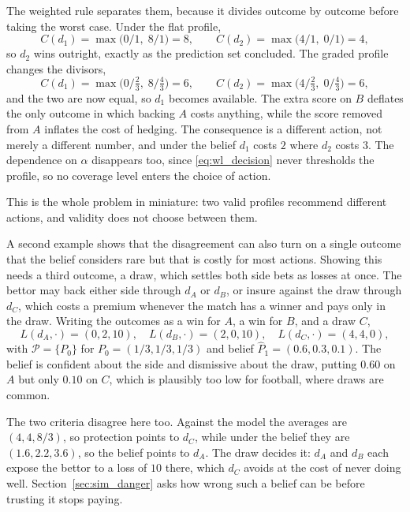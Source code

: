 The weighted rule separates them, because it divides outcome by outcome before
taking the worst case. Under the flat profile,
\[
  C(d_1)=\max\bigl(0/1,\; 8/1\bigr)=8,
  \qquad
  C(d_2)=\max\bigl(4/1,\; 0/1\bigr)=4,
\]
so $d_2$ wins outright, exactly as the prediction set concluded. The graded
profile changes the divisors,
\[
  C(d_1)=\max\bigl(0\big/\tfrac23,\; 8\big/\tfrac43\bigr)=6,
  \qquad
  C(d_2)=\max\bigl(4\big/\tfrac23,\; 0\big/\tfrac43\bigr)=6,
\]
and the two are now equal, so $d_1$ becomes available. The extra score on $B$
deflates the only outcome in which backing $A$ costs anything, while the score
removed from $A$ inflates the cost of hedging. The consequence is a different
action, not merely a different number, and under the belief $d_1$ costs $2$
where $d_2$ costs $3$. The dependence on $\alpha$ disappears too, since
\eqref{eq:wl_decision} never thresholds the profile, so no coverage level
enters the choice of action.

This is the whole problem in miniature: two valid profiles recommend
different actions, and validity does not choose between them.

A second example shows that the disagreement can also turn on a single
outcome that the belief considers rare but that is costly for most actions.
Showing this needs a third outcome, a draw, which settles both side bets as
losses at once. The bettor may back either side through $d_A$ or $d_B$, or
insure against the draw through $d_C$, which costs a premium whenever the
match has a winner and pays only in the draw. Writing the outcomes as a win
for $A$, a win for $B$, and a draw $C$,
\begin{equation}
  L(d_A,\cdot)=(0,2,10),\quad
  L(d_B,\cdot)=(2,0,10),\quad
  L(d_C,\cdot)=(4,4,0),
  \label{eq:three_loss}
\end{equation}
with $\mathcal P=\{P_0\}$ for $P_0=(1/3,1/3,1/3)$ and belief
$\widehat P_1=(0.6,0.3,0.1)$. The belief is confident about the side and
dismissive about the draw, putting $0.60$ on $A$ but only $0.10$ on $C$, which is
plausibly too low for football, where draws are common.

The two criteria disagree here too. Against the model the averages are
$(4,4,8/3)$, so protection points to $d_C$, while under the belief they are
$(1.6,2.2,3.6)$, so the belief points to $d_A$. The draw decides it: $d_A$ and $d_B$ each
expose the bettor to a loss of $10$ there, which $d_C$ avoids at the cost of never doing
well. Section~\ref{sec:sim_danger} asks how wrong such a belief can be before
trusting it stops paying.
